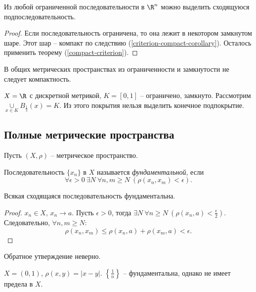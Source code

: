 \begin{corollary}
    Из любой ограниченной последовательности в $\R^{n}$ можно выделить сходящуюся подпоследовательность.
\end{corollary}

\begin{proof}
    Если последовательность ограничена, то она лежит в некотором замкнутом шаре. Этот шар -- компакт по следствию (\ref{criterion-compact-corollary}). Осталось применить теорему (\ref{compact-criterion}).
\end{proof}

\begin{note}
    В общих метрических пространствах из ограниченности и замкнутости не следует компактность.
\end{note}

\begin{example}
    $X = \R$ с дискретной метрикой, $K = [0, 1]$ -- ограничено, замкнуто. Рассмотрим $\underset{x \in K}{\cup} B_{\frac{1}{2}}(x) = K$. Из этого покрытия нельзя выделить конечное подпокрытие.
\end{example}

\subsection{Полные метрические пространства}

Пусть $(X, \rho)$ -- метрическое пространство.

\begin{definition}
    Последовательность $\{x_{n}\}$ в $X$ называется \textit{фундаментальной}, если 
    \[\forall \epsilon > 0 \ \exists N \ \forall n, m \geq N \ (\rho(x_{n}, x_{m}) < \epsilon).\]
\end{definition}

\begin{lemma}
    Всякая сходящаяся последовательность фундаментальна.
\end{lemma}

\begin{proof}
    $x_{n} \in X$, $x_{n} \to a$. Пусть $\epsilon > 0$, тогда $\exists N \ \forall n \geq N \ (\rho(x_{n}, a) < \frac{\epsilon}{2})$. Следовательно, $\forall n, m \geq N$:
    \[\rho (x_{n}, x_{m}) \leq \rho(x_{n}, a) + \rho(x_{m}, a) < \epsilon.\]
\end{proof}

Обратное утверждение неверно.

\begin{example}
    $X = (0, 1)$, $\rho(x, y) = |x - y|$. $\left\{\frac{1}{n}\right\}$ -- фундаментальна, однако не имеет предела в $X$.
\end{example}

